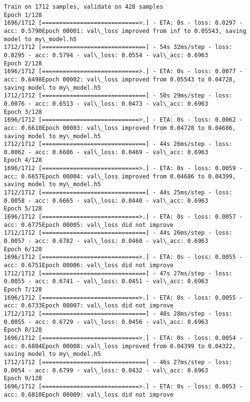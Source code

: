 \documentclass[11pt]{article}
\begin{document}
    \begin{Verbatim}[commandchars=\\\{\}]
Train on 1712 samples, validate on 428 samples
Epoch 1/128
1696/1712 [============================>.] - ETA: 0s - loss: 0.0297 - acc: 0.5790Epoch 00001: val\_loss improved from inf to 0.05543, saving model to my\_model.h5
1712/1712 [==============================] - 54s 32ms/step - loss: 0.0295 - acc: 0.5794 - val\_loss: 0.0554 - val\_acc: 0.6963
Epoch 2/128
1696/1712 [============================>.] - ETA: 0s - loss: 0.0077 - acc: 0.6498Epoch 00002: val\_loss improved from 0.05543 to 0.04728, saving model to my\_model.h5
1712/1712 [==============================] - 50s 29ms/step - loss: 0.0076 - acc: 0.6513 - val\_loss: 0.0473 - val\_acc: 0.6963
Epoch 3/128
1696/1712 [============================>.] - ETA: 0s - loss: 0.0062 - acc: 0.6610Epoch 00003: val\_loss improved from 0.04728 to 0.04686, saving model to my\_model.h5
1712/1712 [==============================] - 44s 26ms/step - loss: 0.0062 - acc: 0.6606 - val\_loss: 0.0469 - val\_acc: 0.6963
Epoch 4/128
1696/1712 [============================>.] - ETA: 0s - loss: 0.0059 - acc: 0.6657Epoch 00004: val\_loss improved from 0.04686 to 0.04399, saving model to my\_model.h5
1712/1712 [==============================] - 44s 25ms/step - loss: 0.0058 - acc: 0.6665 - val\_loss: 0.0440 - val\_acc: 0.6963
Epoch 5/128
1696/1712 [============================>.] - ETA: 0s - loss: 0.0057 - acc: 0.6775Epoch 00005: val\_loss did not improve
1712/1712 [==============================] - 44s 26ms/step - loss: 0.0057 - acc: 0.6782 - val\_loss: 0.0460 - val\_acc: 0.6963
Epoch 6/128
1696/1712 [============================>.] - ETA: 0s - loss: 0.0055 - acc: 0.6751Epoch 00006: val\_loss did not improve
1712/1712 [==============================] - 47s 27ms/step - loss: 0.0055 - acc: 0.6741 - val\_loss: 0.0451 - val\_acc: 0.6963
Epoch 7/128
1696/1712 [============================>.] - ETA: 0s - loss: 0.0055 - acc: 0.6733Epoch 00007: val\_loss did not improve
1712/1712 [==============================] - 48s 28ms/step - loss: 0.0055 - acc: 0.6729 - val\_loss: 0.0456 - val\_acc: 0.6963
Epoch 8/128
1696/1712 [============================>.] - ETA: 0s - loss: 0.0054 - acc: 0.6804Epoch 00008: val\_loss improved from 0.04399 to 0.04322, saving model to my\_model.h5
1712/1712 [==============================] - 46s 27ms/step - loss: 0.0054 - acc: 0.6799 - val\_loss: 0.0432 - val\_acc: 0.6963
Epoch 9/128
1696/1712 [============================>.] - ETA: 0s - loss: 0.0053 - acc: 0.6810Epoch 00009: val\_loss did not improve

\end{Verbatim}
\end{document}
